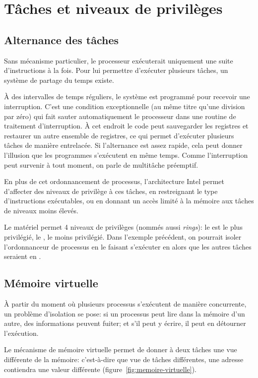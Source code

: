 \section{Tâches et niveaux de privilèges}
\label{sec:taches}

\subsection*{Alternance des tâches}

Sans mécanisme particulier, le processeur exécuterait uniquement une suite
d'instructions à la fois. Pour lui permettre d'exécuter plusieurs tâches, un
système de partage du temps existe.

À des intervalles de temps réguliers, le système est programmé pour recevoir une
interruption. C'est une condition exceptionnelle (au même titre qu'une division
par zéro) qui fait sauter automatiquement le processeur dans une routine de
traitement d'interruption. À cet endroit le code peut sauvegarder les registres
et restaurer un autre ensemble de registres, ce qui permet d'exécuter plusieurs
tâches de manière entrelacée. Si l'alternance est assez rapide, cela peut donner
l'illusion que les programmes s'exécutent en même temps. Comme l'interruption
peut survenir à tout moment, on parle de multitâche préemptif.

En plus de cet ordonnancement de processus, l'architecture Intel permet
d'affecter des niveaux de privilège à ces tâches, en restreignant le type
d'instructions exécutables, ou en donnant un accès limité à la mémoire aux
tâches de niveaux moins élevés.

Le matériel permet 4 niveaux de privilèges (nommés aussi \emph{rings}): le
 est le plus privilégié, le , le moins privilégié. Dans
l'exemple précédent, on pourrait isoler l'ordonnanceur de processus en le
faisant s'exécuter en  alors que les autres tâches seraient en .

\subsection*{Mémoire virtuelle}

À partir du moment où plusieurs processus s'exécutent de manière concurrente, un
problème d'isolation se pose: si un processus peut lire dans la mémoire d'un
autre, des informations peuvent fuiter; et s'il peut y écrire, il peut en
détourner l'exécution.

Le mécanisme de mémoire virtuelle permet de donner à deux tâches une vue
différente de la mémoire: c'est-à-dire que vue de tâches différentes, une
adresse contiendra une valeur différente (figure~\ref{fig:memoire-virtuelle}).

